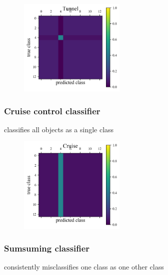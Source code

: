 \begin{figure}
	\begin{center}
		\includegraphics[width=0.45\textwidth]{./fig/Tunnel.png}\\
		\caption{}
		\label{fig:tunnel_data}
	\end{center}
\end{figure}

\subsubsection{Cruise control classifier}
\label{sec:cruise_data}

classifies all objects as a single class

\begin{figure}
	\begin{center}
		\includegraphics[width=0.45\textwidth]{./fig/Cruise.png}
		\caption{}
		\label{fig:cruise_data}
	\end{center}
\end{figure}

\subsubsection{Sumsuming classifier}
\label{sec:subsume_data}

consistently misclassifies one class as one other class

